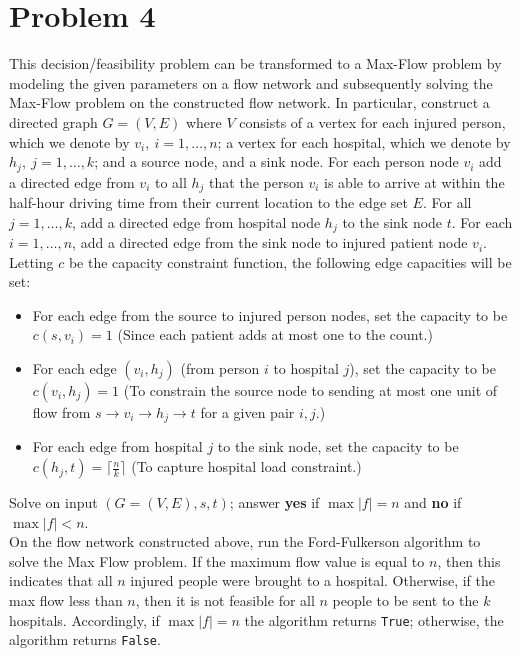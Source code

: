 \documentclass[twoside,11pt]{homework}
\begin{document}
\section*{Problem 4}
This decision/feasibility problem can be transformed to a Max-Flow problem by modeling the given parameters on a flow network and subsequently solving the Max-Flow problem on the constructed flow network.  In particular, construct a directed graph $G = (V, E)$ where $V$ consists of a vertex for each injured person, which we denote by $v_i,  \ i = 1, \dots,  n$; a vertex for each hospital,  which we denote by $h_j,  \ j = 1,  \dots,  k$; and a source node,  and a sink node.  For  each person node $v_i$ add a directed edge from $v_i$ to all $h_j$ that the person $v_i$ is able to arrive at within the half-hour driving time from their current location to the edge set $E$.  For all $j = 1, \dots, k$, add a directed edge from hospital node $h_j$ to the sink node $t$.  For each $i = 1, \dots, n$,  add a directed edge from the sink node to injured patient node $v_i$.  Letting $c$ be the capacity constraint function,  the following edge capacities will be set:
\begin{itemize}
\item  For each edge from the source to injured person nodes,  set the capacity to be $c(s,  v_i) = 1$
{\color{blue} (Since each patient adds at most one to the count.)}
\item  For each edge $(v_i, h_j)$ (from person $i$ to hospital $j$), set the capacity to be $c(v_i, h_j) = 1$ 
{\color{blue} (To constrain the source node to sending at most one unit of flow from $s \rightarrow v_i \rightarrow h_j \rightarrow t $ for a given pair $i,  j$.)}
\item  For each edge from hospital $j$ to the sink node,  set the capacity to be $c(h_j,  t) = \lceil \frac{n}{k} \rceil$
{\color{blue} (To capture hospital load constraint.)}
\end{itemize}
\noindent
Solve  on input $(G = (V, E),  s, t)$; answer \textbf{yes} if $\max |f| = n$ and \textbf{no} if $\max |f| < n$. \\

\noindent
On the flow network constructed above,  run the Ford-Fulkerson algorithm to solve the Max Flow problem.  If the maximum flow value is equal to $n$, then this indicates that all $n$ injured people were brought to a hospital.  Otherwise,  if the max flow less than $n$, then it is not feasible for all $n$ people to be sent to the $k$ hospitals. Accordingly,  if $\max |f| = n$ the algorithm returns \texttt{True}; otherwise, the algorithm returns \texttt{False}.
\end{document}
